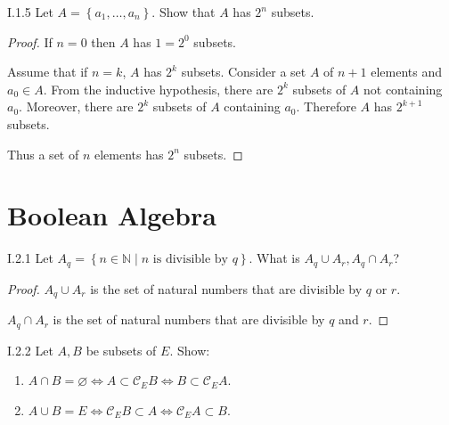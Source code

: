 \begin{problem}{I.1.5}
Let \( A = \left\{ a_{1}, \ldots, a_{n} \right\} \). Show that \( A \) has \( 2^{n} \) subsets.
\end{problem}

\begin{proof}
	If \( n = 0 \) then \( A \) has \( 1 = 2^{0} \) subsets.

	Assume that if \( n = k \), \( A \) has \( 2^{k} \) subsets. Consider a set \( A \) of \( n + 1 \) elements and \( a_{0} \in A \). From the inductive hypothesis, there are \( 2^{k} \) subsets of \( A \) not containing \( a_{0} \). Moreover, there are \( 2^{k} \) subsets of \( A \) containing \( a_{0} \). Therefore \( A \) has \( 2^{k+1} \) subsets.

	Thus a set of \( n \) elements has \( 2^{n} \) subsets.
\end{proof}

\section{Boolean Algebra}

\begin{problem}{I.2.1}
Let \( A_{q} = \left\{ n \in \mathbb{N} \mid n \text{ is divisible by } q \right\} \). What is \( A_{q} \cup A_{r}, A_{q} \cap A_{r} \)?
\end{problem}

\begin{proof}
	\( A_{q} \cup A_{r} \) is the set of natural numbers that are divisible by \( q \) or \( r \).

	\( A_{q} \cap A_{r} \) is the set of natural numbers that are divisible by \( q \) and \( r \).
\end{proof}

\begin{problem}{I.2.2}
Let \( A, B \) be subsets of \( E \). Show:
\begin{enumerate}[label={(\alph*)},leftmargin=*]
	\item \( A \cap B = \varnothing \iff A \subset \mathscr{C}_{E}B \iff B \subset \mathscr{C}_{E}A \).
	\item \( A \cup B = E \iff \mathscr{C}_{E}B \subset A \iff \mathscr{C}_{E}A \subset B \).
\end{enumerate}
\end{problem}

